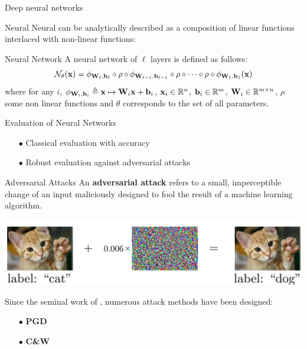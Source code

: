 \begin{frame}{Deep neural networks}

  Neural Neural can be analytically described as a composition of linear functions interlaced with non-linear functions:
  \begin{block}{Neural Network}
      A neural network of $\ell$ layers is defined as follows:
      \begin{equation*}
	\mathcal{N}_\theta(\mathbf{x}) = \phi_{\mathbf{W}_\ell,\mathbf{b}_\ell} \circ \rho \circ \phi_{\mathbf{W}_{\ell-1}, \mathbf{b}_{\ell-1}} \circ \rho \circ \cdots \circ \rho \circ \phi_{\mathbf{W}_1, \mathbf{b}_1}(\mathbf{x})
      \end{equation*}
      where for any $i$, $\phi_{\mathbf{W}_i,\mathbf{b}_i} \triangleq \mathbf{x} \mapsto \mathbf{W}_i \mathbf{x} + \mathbf{b}_i$, $\mathbf{x}_i \in {\ensuremath \mathbb{R}}^n$, $\mathbf{b}_i \in {\ensuremath \mathbb{R}}^m$, $\mathbf{W}_i \in {\ensuremath \mathbb{R}}^{m \times n}$, $\rho$ some non linear functions and $\theta$ corresponds to the set of all parameters.
  \end{block}

  \begin{block}{Evaluation of Neural Networks}
    \begin{itemize}
      \item[$\bullet$] Classical evaluation with accuracy
      \item[$\bullet$] Robust evaluation against adversarial attacks
    \end{itemize}
  \end{block}

\end{frame}


\begin{frame}{Adversarial Attacks}
  An \textbf{adversarial attack} refers to a small, imperceptible change of an input maliciously designed to fool the result of a machine learning algorithm. 
  \begin{center}
    \includegraphics[width=\textwidth]{images/ExampleAdversarialCatDog.pdf}
  \end{center}
  Since the seminal work of \cite{Szegedy2013IntriguingPO}, numerous attack methods have been designed:
  \begin{itemize}
    \item[$\bullet$] \textbf{PGD} \cite{madry2018towards}
    \item[$\bullet$] \textbf{C\&W} \cite{carlini2017towards}
  \end{itemize}

\end{frame}


